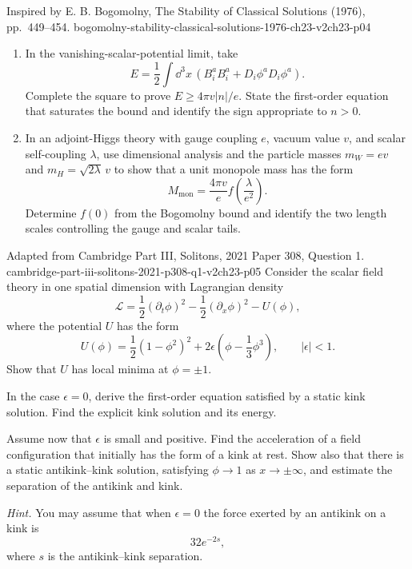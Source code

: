 \begin{enumerate}
  {Inspired by E. B. Bogomolny, The Stability of Classical Solutions
  (1976), pp.~449--454.}
  {bogomolny-stability-classical-solutions-1976-ch23-v2ch23-p04}
  \begin{enumerate}
    \item[(a)]
    In the vanishing-scalar-potential limit, take
    \[
      E=\frac12\int \dd^3x\,
         \left(B_i^aB_i^a+D_i\phi^aD_i\phi^a\right).
    \]
    Complete the square to prove
    \(E\ge 4\pi v\lvert n\rvert/e\).  State the first-order equation that
    saturates the bound and identify the sign appropriate to \(n>0\).
    \item[(b)]
    In an adjoint-Higgs theory with gauge coupling \(e\), vacuum value
    \(v\), and scalar self-coupling \(\lambda\), use dimensional analysis
    and the particle masses \(m_W=ev\) and
    \(m_H=\sqrt{2\lambda}\,v\) to show that a unit monopole mass has the
    form
    \[
      M_{\mathrm{mon}}=\frac{4\pi v}{e}
        f\left(\frac{\lambda}{e^2}\right).
    \]
    Determine \(f(0)\) from the Bogomolny bound and identify the two
    length scales controlling the gauge and scalar tails.
  \end{enumerate}

  {Adapted from Cambridge Part III, Solitons, 2021 Paper 308,
  Question 1.}
  {cambridge-part-iii-solitons-2021-p308-q1-v2ch23-p05}
  Consider the scalar field theory in one spatial dimension with
  Lagrangian density
  \[
    \mathcal L=\frac12(\partial_t\phi)^2
      -\frac12(\partial_x\phi)^2-U(\phi),
  \]
  where the potential \(U\) has the form
  \[
    U(\phi)=\frac12(1-\phi^2)^2
      +2\epsilon\left(\phi-\frac13\phi^3\right),
    \qquad |\epsilon|<1.
  \]
  Show that \(U\) has local minima at \(\phi=\pm1\).

  In the case \(\epsilon=0\), derive the first-order equation satisfied by
  a static kink solution.  Find the explicit kink solution and its
  energy.

  Assume now that \(\epsilon\) is small and positive.  Find the
  acceleration of a field configuration that initially has the form of
  a kink at rest.  Show also that there is a static antikink--kink
  solution, satisfying \(\phi\to1\) as \(x\to\pm\infty\), and estimate
  the separation of the antikink and kink.

  \emph{Hint.}  You may assume that when \(\epsilon=0\) the force exerted
  by an antikink on a kink is
  \[
    32e^{-2s},
  \]
  where \(s\) is the antikink--kink separation.


\end{enumerate}
